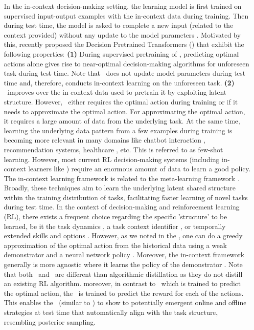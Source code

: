 \documentclass[10pt]{article}
\theoremstyle{plain}
\theoremstyle{definition}
\theoremstyle{remark}
\begin{document}
In the in-context decision-making setting, the learning model is first trained on supervised input-output examples with the in-context data during training. Then during test time, the model is asked to complete a new input (related to the context provided) without any update to the model parameters \citep{xie2021explanation, min2022rethinking}. Motivated by this, \citet{lee2023supervised} recently proposed the Decision Pretrained Transformers (\dpt) that exhibit the following properties: \textbf{(1)} During supervised pretraining of \dpt, predicting optimal actions alone gives rise to near-optimal decision-making algorithms for unforeseen task during test time. Note that \dpt\ does not update model parameters during test time and, therefore, conducts in-context learning on the unforeseen task. \textbf{(2)} \dpt\ improves over the in-context data used to pretrain it by exploiting latent structure. However, \dpt\ either requires the optimal action during training or if it needs to approximate the optimal action. For approximating the optimal action, it requires a large amount of data from the underlying task.
At the same time, learning the underlying data pattern from a few examples during training is becoming more relevant in many domains like chatbot interaction \citep{madotto2021few,semnani2023wikichat}, recommendation systems, healthcare \citep{ge2022few, liu2023large}, etc. This is referred to as few-shot learning.
However, most current RL decision-making systems (including in-context learners like \dpt) require an enormous amount of data to learn a good policy.
The in-context learning framework is related to the meta-learning framework \citep{bengio1990learning, schaul2010metalearning}.  Broadly, these techniques aim to learn the underlying latent shared structure within the training distribution of tasks, facilitating faster learning of novel tasks during test time. In the context of decision-making and reinforcement learning (RL), there exists a frequent choice regarding the specific 'structure' to be learned, be it the task dynamics \citep{fu2016one, nagabandi2018learning, landolfi2019model}, a task context identifier \citep{rakelly2019efficient, zintgraf2019varibad, liu2021decoupling}, or temporally extended skills and options \citep{perkins1999using, gupta2018meta, jiang2022learning}.
However, as we noted in the , one can do a greedy approximation of the optimal action from the historical data using a weak demonstrator and a neural network policy \citep{finn2017model, rothfuss2018promp}. Moreover, the in-context framework generally is more agnostic where it learns the policy of the demonstrator \citep{duan2016rl, wang2016learning, mishra2017simple}. Note that both \dptg\ and \pred\ are different than algorithmic distillation \citep{laskin2022context, lu2023structured} as they do not distill an existing RL algorithm. moreover, in contrast to \dptg\ which is trained to predict the optimal action, the \pred\ is trained to predict the reward for each of the actions. This enables the \pred\ (similar to \dptg) to show to potentially emergent online and offline strategies at test time that automatically align with the task structure, resembling posterior sampling.
\end{document}
